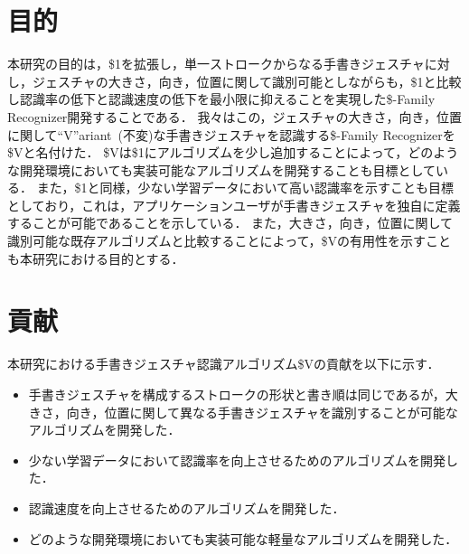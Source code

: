\section{目的}
本研究の目的は，\$1を拡張し，単一ストロークからなる手書きジェスチャに対し，ジェスチャの大きさ，向き，位置に関して識別可能としながらも，\$1と比較し認識率の低下と認識速度の低下を最小限に抑えることを実現した\$-Family Recognizer開発することである．
我々はこの，ジェスチャの大きさ，向き，位置に関して``V''ariant~(不変)な手書きジェスチャを認識する\$-Family Recognizerを\$Vと名付けた．
\$Vは\$1にアルゴリズムを少し追加することによって，どのような開発環境においても実装可能なアルゴリズムを開発することも目標としている．
また，\$1と同様，少ない学習データにおいて高い認識率を示すことも目標としており，これは，アプリケーションユーザが手書きジェスチャを独自に定義することが可能であることを示している．
また，大きさ，向き，位置に関して識別可能な既存アルゴリズムと比較することによって，\$Vの有用性を示すことも本研究における目的とする．



\section{貢献}
本研究における手書きジェスチャ認識アルゴリズム\$Vの貢献を以下に示す．
\begin{itemize}
\item 手書きジェスチャを構成するストロークの形状と書き順は同じであるが，大きさ，向き，位置に関して異なる手書きジェスチャを識別することが可能なアルゴリズムを開発した．
\item 少ない学習データにおいて認識率を向上させるためのアルゴリズムを開発した．
\item 認識速度を向上させるためのアルゴリズムを開発した．
\item どのような開発環境においても実装可能な軽量なアルゴリズムを開発した．
\end{itemize}

